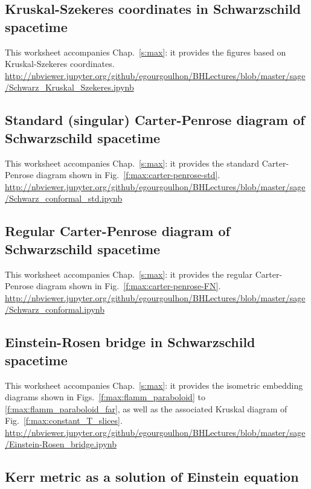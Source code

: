 \subsection{Kruskal-Szekeres coordinates in Schwarzschild spacetime}

This worksheet accompanies Chap.~\ref{s:max}: it provides the figures based on
Kruskal-Szekeres coordinates.\\[1ex]
{\footnotesize
\url{http://nbviewer.jupyter.org/github/egourgoulhon/BHLectures/blob/master/sage/Schwarz_Kruskal_Szekeres.ipynb}
}

\subsection{Standard (singular) Carter-Penrose diagram of Schwarzschild spacetime}
\label{s:sam:std_Carter-Penrose}
This worksheet accompanies Chap.~\ref{s:max}: it provides the standard
Carter-Penrose diagram shown in Fig.~\ref{f:max:carter-penrose-std}.\\[1ex]
{\footnotesize
\url{http://nbviewer.jupyter.org/github/egourgoulhon/BHLectures/blob/master/sage/Schwarz_conformal_std.ipynb}
}

\subsection{Regular Carter-Penrose diagram of Schwarzschild spacetime}
\label{s:sam:reg_Carter-Penrose}
This worksheet accompanies Chap.~\ref{s:max}: it provides the regular
Carter-Penrose diagram shown in Fig.~\ref{f:max:carter-penrose-FN}.\\[1ex]
{\footnotesize
\url{http://nbviewer.jupyter.org/github/egourgoulhon/BHLectures/blob/master/sage/Schwarz_conformal.ipynb}
}

\subsection{Einstein-Rosen bridge in Schwarzschild spacetime}
\label{s:sam:Einstein-Rosen}
This worksheet accompanies Chap.~\ref{s:max}: it provides the
isometric embedding diagrams shown in Figs.~\ref{f:max:flamm_paraboloid}
to \ref{f:max:flamm_paraboloid_far}, as well as the associated
Kruskal diagram of Fig.~\ref{f:max:constant_T_slices}.\\[1ex]
{\footnotesize
\url{http://nbviewer.jupyter.org/github/egourgoulhon/BHLectures/blob/master/sage/Einstein-Rosen_bridge.ipynb}
}


\subsection{Kerr metric as a solution of Einstein equation} \label{s:sam:Kerr_solution}

